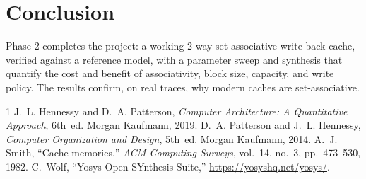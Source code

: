 \documentclass[conference]{IEEEtran}
\begin{document}
\section{Conclusion}
Phase 2 completes the project: a working 2-way set-associative write-back cache,
verified against a reference model, with a parameter sweep and synthesis that
quantify the cost and benefit of associativity, block size, capacity, and write
policy. The results confirm, on real traces, why modern caches are
set-associative.

\begin{thebibliography}{1}
 J.~L. Hennessy and D.~A. Patterson, \emph{Computer
Architecture: A Quantitative Approach}, 6th~ed. Morgan Kaufmann, 2019.
 D.~A. Patterson and J.~L. Hennessy, \emph{Computer
Organization and Design}, 5th~ed. Morgan Kaufmann, 2014.
 A.~J. Smith, ``Cache memories,'' \emph{ACM Computing Surveys},
vol.~14, no.~3, pp.~473--530, 1982.
 C.~Wolf, ``Yosys Open SYnthesis Suite,''
\url{https://yosyshq.net/yosys/}.
\end{thebibliography}
\end{document}
